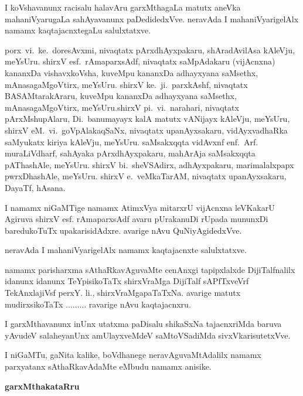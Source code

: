 I koVshavanunx racisalu halavAru garxMthagaLa matutx aneVka mahaniVyarugaLa sahAyavanunx paDedidedxVve. neravAda I mahaniVyarigelAlx namamx kaqtajacnxtegaLu salulxtatxve.

porx\ vi.~ke.\ doresAvxmi, nivaqtatx pArxdhAyxpakaru, shAradAvilAsa kAleVju, meYsUru. shirxV esf.\ rAmaparxsAdf, nivaqtatx saMpAdakaru (vijAcnxna) kananxDa vishavxkoVsha, kuveMpu kananxDa adhayxyana saMsethx, mAnasagaMgoVtirx, meYsUru. shirxV ke.~ji.\ parxkAshf, nivaqtatx BASAMtarakAraru, kuveMpu kananxDa adhayxyana saMsethx, mAnasagaMgoVtirx, meYsUru.\break shirxV pi.~vi.\ narahari, nivaqtatx pArxMshupAlaru, Di.~banumayayx kalA matutx vANijayx kAleVju, meYsUru, shirxV eM.~vi.\ goVpAlakaqSaNx, nivaqtatx upanAyxsakaru, vidAyxvadhaRka saMyukatx kiriya kAleVju, meYsUru. saMsakxqqta vidAvxnf enf.~Arf. muraLiVdharf, sahAyaka pArxdhAyxpakaru, mahArAja saMsakxqqta pAThashAle, meYsUru. shirxV bi.\ sheVSAdirx, adhAyxpakaru, marimalalxpapx pwrxDhashAle, meYsUru. shirxV e.\ veMkaTarAM, nivaqtatx upanAyxsakaru, DayaTf, hAsana.

I namamx niGaMTige namamx AtimxVya mitarxrU vijAcnxna leVKakarU Agiruva shirxV esf. rAmaparxsAdf avaru pUrakanuDi rUpada mununxDi baredukoTuTx upakarisidAdxre. avarige nAvu QuNiyAgidedxVve.

neravAda I mahaniVyarigelAlx namamx kaqtajacnxte salulxtatxve.

namamx parisharxma sAthaRkavAguvaMte cenAnxgi tapipxlalxde DijiTalfnalilx idanunx idanunx TeYpisikoTaTx    
 shirxVraMga DijiTalf sAPfTxveVrf TekAnxlajiVsf perxY. li., shirxVraMgapaTaTxNa. avarige matutx mudirxsikoTaTx  $\ldots\ldots\ldots$ ravarige nAvu kaqtajacnxru.

I garxMthavanunx inUnx utatxma paDisalu shikaSxNa tajacnxriMda baruva yAvudeV salaheyanUnx amUlayxveMdeV saMtoVSadiMda sivxVkarisutetxVve.

I niGaMTu,  gaNita kalike, boVdhanege neravAguvaMtAdalilx namamx parxyatanx sAthaRkavAdaMte eMbudu namamx anisike.

\vskip 1.5cm

\noindent
{}\hfill {\Large\bf garxMthakataRru}\qquad\qquad\,

\smallskip
\noindent
{}






